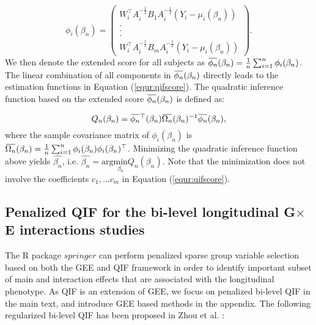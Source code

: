 \documentclass[12pt]{article}
\newcommand{\overbar}[1]{\mkern 1.5mu\overline{\mkern-1.5mu#1\mkern-1.5mu}\mkern 1.5mu}
\begin{document}
\begin{equation}\label{equr:extscore}
	\phi_i(\beta_n)=\left(\begin{array}{c} W_i^\top A_i^{-\frac{1}{2}}B_1A_i^{-\frac{1}{2}}(Y_i-\mu_i (\beta_n)) \\ . \\ . \\ . \\
		W_i^\top A_i^{-\frac{1}{2}}B_mA_i^{-\frac{1}{2}}(Y_i-\mu_i (\beta_n)) \end{array}\right).
\end{equation}
We then denote the extended score for all subjects as $\overbar{\phi_n}(\beta_n)=\frac{1}{n}\sum_{i=1}^{n}\phi_i(\beta_n)$. The linear combination of all components in $\overbar{\phi_n}(\beta_n)$ directly leads to the estimation functions in Equation (\ref{equr:qifscore}). The quadratic inference function based on the extended score $\overbar{\phi_n}(\beta_n)$ is defined as:

\begin{equation*}
	Q_n(\beta_n)=\overbar{\phi_n}^\top(\beta_n)\overbar{\Omega_n}(\beta_n)^{-1}\overbar{\phi_n}(\beta_n), 
\end{equation*} 
where the sample covariance matrix of $\phi_i(\beta_n)$ is $\overbar{\Omega_n}(\beta_n)=\frac{1}{n}\sum_{i=1}^{n}\phi_i(\beta_n)\phi_i(\beta_n)^\top$. Minimizing the quadratic inference function above yields $\hat{\beta_n}$, i.e. $\hat{\beta_n}=\text{arg}\underset{\beta_n}{\text{min}}Q_n(\beta_n)$. Note that the minimization does not involve the coefficients $c_1, ... c_m$ in Equation (\ref{equr:qifscore}). 


\subsection{Penalized QIF for the bi-level longitudinal G$\times$E interactions studies}\label{sec:3.3}

The R package \href{https://CRAN.R-project.org/package=springer}{$springer$}     
\cite{SP} can perform penalized sparse group variable selection based on both the GEE and QIF framework in order to identify important subset of main and interaction effects that are associated with the longitudinal phenotype. As QIF is an extension of GEE, we focus on penalized bi-level QIF in the main text, and introduce GEE based methods in the appendix. The following regularized bi-level QIF has been proposed in Zhou et al.  \cite{zhou2022sparse}:
\end{document}
